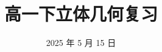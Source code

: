 \documentclass[aspectratio=169]{ctexbeamer}
\begin{document}
\title{高一下立体几何复习}
\date{2025 年 5 月 15 日}
\begin{frame}{}{}%
    \titlepage{}
\end{frame}
\begin{frame}{}{}
    
\end{frame}
\end{document}
